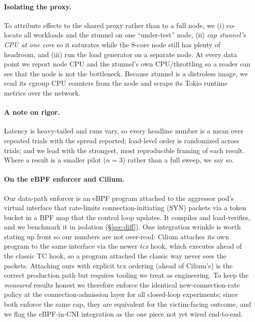 \documentclass[10pt,twocolumn]{article}
\begin{document}
\paragraph{Isolating the proxy.} To attribute effects to the shared proxy rather than to
a full node, we (i) co-locate all workloads and the ztunnel on one ``under-test'' node,
(ii) \emph{cap ztunnel's CPU at one core} so it saturates while the 8-core node still has
plenty of headroom, and (iii) run the load generator on a separate node. At every data
point we report node CPU and the ztunnel's own CPU/throttling so a reader can see that
the node is not the bottleneck. Because ztunnel is a distroless image, we read its cgroup
CPU counters from the node and scrape its Tokio runtime metrics over the network.

\paragraph{A note on rigor.} Latency is heavy-tailed and runs vary, so every headline
number is a mean over repeated trials with the spread reported; load-level order is
randomized across trials; and we lead with the strongest, most reproducible framing of
each result. Where a result is a smaller pilot ($n{=}3$) rather than a full sweep, we say
so.

\paragraph{On the eBPF enforcer and Cilium.}
\label{sec:setup-ebpf}
Our data-path enforcer is an eBPF program attached to the aggressor pod's virtual
interface that rate-limits connection-initiating (SYN) packets via a token bucket in a
BPF map that the control loop updates. It compiles and load-verifies, and we benchmark it
in isolation (\S\ref{sec:diff}). One integration wrinkle is worth stating up front so our
numbers are not over-read: Cilium attaches its own program to the same interface via the
newer \emph{tcx} hook, which executes ahead of the classic TC hook, so a program attached
the classic way never sees the packets. Attaching ours with explicit tcx ordering (ahead
of Cilium's) is the correct production path but requires tooling we treat as engineering.
To keep the \emph{measured} results honest we therefore enforce the identical
new-connection-rate policy at the connection-admission layer for all closed-loop
experiments; since both enforce the same cap, they are equivalent for the victim-facing
outcome, and we flag the eBPF-in-CNI integration as the one piece not yet wired
end-to-end.
\end{document}
